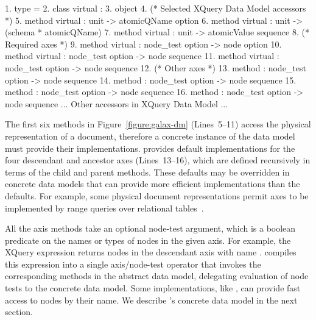 \begin{figure*}
\begin{small}
\begin{code}
{ 1}. type  = 
{ 2}. class virtual  : 
{ 3}. object
{ 4}.   (* Selected XQuery Data Model accessors *)
{ 5}.   method virtual    : unit -> atomicQName option
{ 6}.   method virtual         : unit -> (schema * atomicQName)
{ 7}.   method virtual  : unit -> atomicValue sequence
\mbox{}
{ 8}.   (* Required axes *)
{ 9}.   method virtual       : node_test option -> node option
{10}.   method virtual        : node_test option -> node sequence
{11}.   method virtual    : node_test option -> node sequence
\mbox{}
{12}.   (* Other axes *)
{13}.   method   : node_test option -> node sequence
{14}.   method           : node_test option -> node sequence
{15}.   method     : node_test option -> node sequence
{16}.   method             : node_test option -> node sequence
\mbox{}
  ... Other accessors in XQuery Data Model ...
\end{code}
\end{small}
\caption{Signatures for methods in Galax's abstract node interface}
\label{figure:galax-dm}
\end{figure*}

The first six methods in Figure~\ref{figure:galax-dm} (Lines~5--11) access the
physical representation of a document, therefore a concrete instance
of the data model must provide their implementations.  \Galax{}
provides default implementations for the four {descendant} and
ancestor axes (Lines~13--16), which are defined recursively in terms of the {child}
and {parent} methods.  These defaults may be overridden in concrete data
models that can provide more efficient implementations than the
defaults.  For example, some physical document representations permit
axes to be implemented by range queries over relational
tables~\cite{grust03staircase}.

All the axis methods take an optional node-test argument, which is a
boolean predicate on the names or types of nodes in the given axis.
For example, the XQuery expression  returns
nodes in the descendant axis with name .  \Galax{} compiles
this expression into a single axis/node-test operator that invokes the
corresponding methods in the abstract data model, delegating
evaluation of node tests to the concrete data model.  Some
implementations, like \padx{}, can provide fast access to nodes by
their name.  We describe \padx{}'s concrete data model in the next
section.

